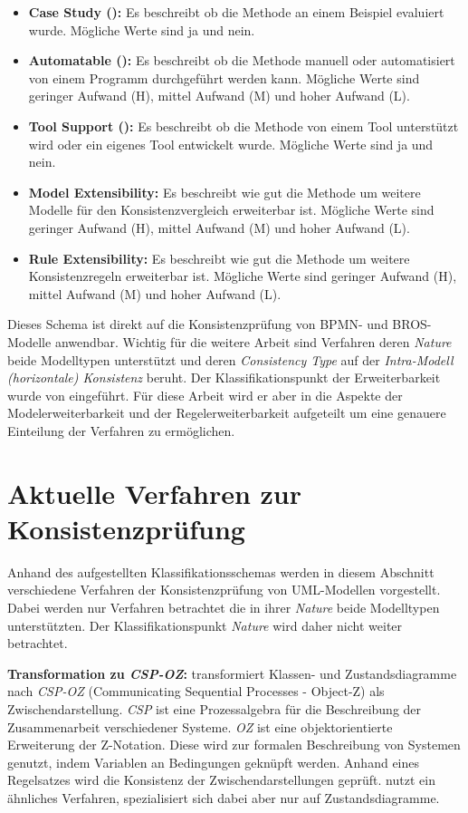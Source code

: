 \begin{itemize}
    \item \textbf{Case Study (\cite{Usman2008}):}
    Es beschreibt ob die Methode an einem Beispiel evaluiert wurde.
    Mögliche Werte sind ja und nein. 
    \item \textbf{Automatable (\cite{Usman2008}):}
    Es beschreibt ob die Methode manuell oder automatisiert von einem Programm durchgeführt werden kann.
    Mögliche Werte sind geringer Aufwand (H), mittel Aufwand (M) und hoher Aufwand (L).
    \item \textbf{Tool Support (\cite{Usman2008}):}
    Es beschreibt ob die Methode von einem Tool unterstützt wird oder ein eigenes Tool entwickelt wurde.
    Mögliche Werte sind ja und nein.
    \item \textbf{Model Extensibility:}
    Es beschreibt wie gut die Methode um weitere Modelle für den Konsistenzvergleich erweiterbar ist.
    Mögliche Werte sind geringer Aufwand (H), mittel Aufwand (M) und hoher Aufwand (L).
    \item \textbf{Rule Extensibility:}
    Es beschreibt wie gut die Methode um weitere Konsistenzregeln erweiterbar ist.
    Mögliche Werte sind geringer Aufwand (H), mittel Aufwand (M) und hoher Aufwand (L).
\end{itemize}

Dieses Schema ist direkt auf die Konsistenzprüfung von BPMN- und BROS-Modelle anwendbar.
Wichtig für die weitere Arbeit sind Verfahren deren \emph{Nature} beide Modelltypen unterstützt und deren \emph{Consistency Type} auf der \emph{Intra-Modell (horizontale) Konsistenz} beruht.
Der Klassifikationspunkt der Erweiterbarkeit wurde von \cite{Lucas2009} eingeführt.
Für diese Arbeit wird er aber in die Aspekte der Modelerweiterbarkeit und der Regelerweiterbarkeit aufgeteilt um eine genauere Einteilung der Verfahren zu ermöglichen.

\section{Aktuelle Verfahren zur Konsistenzprüfung}

Anhand des aufgestellten Klassifikationsschemas werden in diesem Abschnitt verschiedene Verfahren der Konsistenzprüfung von UML-Modellen vorgestellt.
Dabei werden nur Verfahren betrachtet die in ihrer \emph{Nature} beide Modelltypen unterstützten.
Der Klassifikationspunkt \emph{Nature} wird daher nicht weiter betrachtet.

\textbf{Transformation zu \emph{CSP-OZ}:}
\cite{Rasch2003} transformiert Klassen- und Zustandsdiagramme nach \emph{CSP-OZ} (Communicating Sequential Processes - Object-Z) als Zwischendarstellung.
\emph{CSP} ist eine Prozessalgebra für die Beschreibung der Zusammenarbeit verschiedener Systeme. 
\emph{OZ} ist eine objektorientierte Erweiterung der Z-Notation.
Diese wird zur formalen Beschreibung von Systemen genutzt, indem Variablen an Bedingungen geknüpft werden.
Anhand eines Regelsatzes wird die Konsistenz der Zwischendarstellungen geprüft.
\cite{Kim2004} nutzt ein ähnliches Verfahren, spezialisiert sich dabei aber nur auf Zustandsdiagramme.

